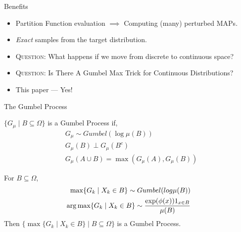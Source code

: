 \begin{frame}{Benefits}
  \begin{itemize}[<+->]
  \item Partition Function evaluation $\implies$ Computing (many) perturbed MAPs. %
  \item \emph{Exact} samples from the target distribution. %
  \end{itemize}
  
  \begin{itemize}[<+->]
  \item \textsc{Question:} What happens if we move from discrete to continuous space?
  \item \textsc{Question:} Is There A Gumbel Max Trick for Continuous Distributions?
  \item {\color{red} This paper --- Yes!}
  \end{itemize}
\end{frame}

\begin{frame}{The Gumbel Process}
    \footnotesize{
  \begin{definition}
    $\{G_\mu \mid B \subseteq \Omega\}$ is a Gumbel Process if,
    \begin{align*} 
      & G_\mu \sim Gumbel(\log \mu(B)) \tag{samples are maxes}\\
      & G_\mu(B) \perp G_\mu(B^c) \tag{samples are disjoint}\\
      & G_\mu(A \cup B) = \max(G_\mu(A),G_\mu(B)) \tag{maxes are consistent}
    \end{align*}
  \end{definition}
  \begin{property}
    For $B \subseteq \Omega$,
    \begin{align*}
      \max \{G_k \mid X_k \in B\} \sim Gumbel(log \mu(B)) \\
      \operatorname*{{arg\,max}} \{G_k \mid X_k \in B\} \sim \frac{\exp(\phi(x))1_{x \in B}}{\mu(B)}
    \end{align*}
    Then $\{ \max \{G_k \mid X_k \in B\} \mid B \subseteq \Omega\}$ is a Gumbel Process.
  \end{property}
  }
\end{frame}

